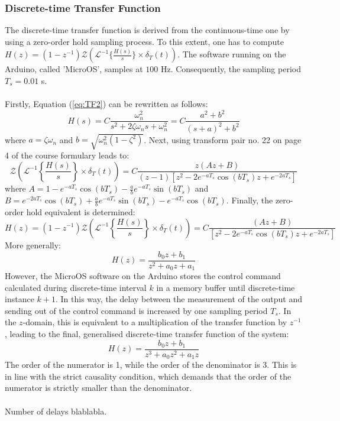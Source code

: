 \documentclass[a4paper,kul]{kulakarticle} %
\begin{document}
\subsubsection*{Discrete-time Transfer Function}

The discrete-time transfer function is derived from the continuous-time one by using a zero-order hold sampling process. To this extent, one has to compute $H(z) = (1-z^{-1}) \mathcal{Z} (\mathcal{L}^{-1}\{\frac{H(s)}{s}\} \times \delta_T(t))$. The software running on the Arduino, called 'MicroOS', samples at $100$ Hz. Consequently, the sampling period $T_s = 0.01$ s. 
\\\\
Firstly, Equation (\ref{eq:TF2}) can be rewritten as follows: 
\begin{equation}
	H(s) = C \frac{\omega_n^2}{s^2 + 2\zeta\omega_ns + \omega_n^2} = C \frac{a^2 + b^2}{(s+a)^2 + b^2}
\end{equation}
where $a = \zeta\omega_n$ and $b = \sqrt{\omega_n^2(1-\zeta^2)}$. Next, using transform pair no. 22 on page 4 of the course formulary leads to:
\begin{equation}
	\mathcal{Z} \left(\mathcal{L}^{-1}\left\{\frac{H(s)}{s}\right\} \times \delta_T(t)\right) = C \frac{z(Az+B)}{(z-1)\left[z^2-2e^{-aT_s}\cos(bT_s)z+e^{-2aT_s}\right]}
\end{equation}
where $A = 1-e^{-aT_s}\cos(bT_s) - \frac{a}{b}e^{-aT_s}\sin(bT_s)$ and $B = e^{-2aT_s}\cos(bT_s) + \frac{a}{b}e^{-aT_s}\sin(bT_s) - e^{-aT_s}\cos(bT_s)$. Finally, the zero-order hold equivalent is determined:
\begin{equation}
	H(z) = (1-z^{-1})\mathcal{Z} \left(\mathcal{L}^{-1}\left\{\frac{H(s)}{s}\right\} \times \delta_T(t)\right) = C \frac{(Az+B)}{\left[z^2-2e^{-aT_s}\cos(bT_s)z+e^{-2aT_s}\right]}
\end{equation}
More generally: 
\begin{equation}
	H(z) = \frac{b_0z + b_1}{z^2 + a_0 z + a_1}
\end{equation}
However, the MicroOS software on the Arduino stores the control command calculated during discrete-time interval $k$ in a memory buffer until discrete-time instance $k+1$. In this way, the delay between the measurement of the output and sending out of the control command is increased by one sampling period $T_s$. In the $z$-domain, this is equivalent to a multiplication of the transfer function by $z^{-1}$, leading to the final, generalised discrete-time transfer function of the system:
\begin{equation}
	\label{eq:TF3}
	H(z) = \frac{b_0z + b_1}{z^3 + a_0 z^2 + a_1 z}
\end{equation}
The order of the numerator is 1, while the order of the denominator is 3. This is in line with the strict causality condition, which demands that the order of the numerator is strictly smaller than the denominator. 
\\\\
Number of delays blablabla.
\end{document}
